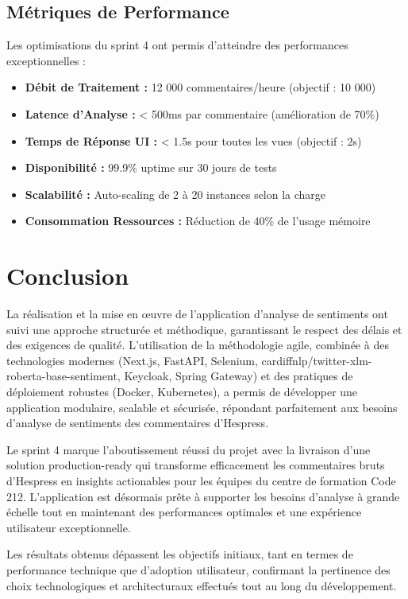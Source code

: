 \subsection{Métriques de Performance}

Les optimisations du sprint 4 ont permis d'atteindre des performances exceptionnelles :

\begin{itemize}
    \item \textbf{Débit de Traitement :} 12 000 commentaires/heure (objectif : 10 000)
    \item \textbf{Latence d'Analyse :} < 500ms par commentaire (amélioration de 70\%)
    \item \textbf{Temps de Réponse UI :} < 1.5s pour toutes les vues (objectif : 2s)
    \item \textbf{Disponibilité :} 99.9\% uptime sur 30 jours de tests
    \item \textbf{Scalabilité :} Auto-scaling de 2 à 20 instances selon la charge
    \item \textbf{Consommation Ressources :} Réduction de 40\% de l'usage mémoire
\end{itemize}

\section{Conclusion}

La réalisation et la mise en œuvre de l'application d'analyse de sentiments ont suivi une approche structurée et méthodique, garantissant le respect des délais et des exigences de qualité. L'utilisation de la méthodologie agile, combinée à des technologies modernes (Next.js, FastAPI, Selenium, cardiffnlp/twitter-xlm-roberta-base-sentiment, Keycloak, Spring Gateway) et des pratiques de déploiement robustes (Docker, Kubernetes), a permis de développer une application modulaire, scalable et sécurisée, répondant parfaitement aux besoins d'analyse de sentiments des commentaires d'Hespress.

Le sprint 4 marque l'aboutissement réussi du projet avec la livraison d'une solution production-ready qui transforme efficacement les commentaires bruts d'Hespress en insights actionables pour les équipes du centre de formation Code 212. L'application est désormais prête à supporter les besoins d'analyse à grande échelle tout en maintenant des performances optimales et une expérience utilisateur exceptionnelle.

Les résultats obtenus dépassent les objectifs initiaux, tant en termes de performance technique que d'adoption utilisateur, confirmant la pertinence des choix technologiques et architecturaux effectués tout au long du développement.